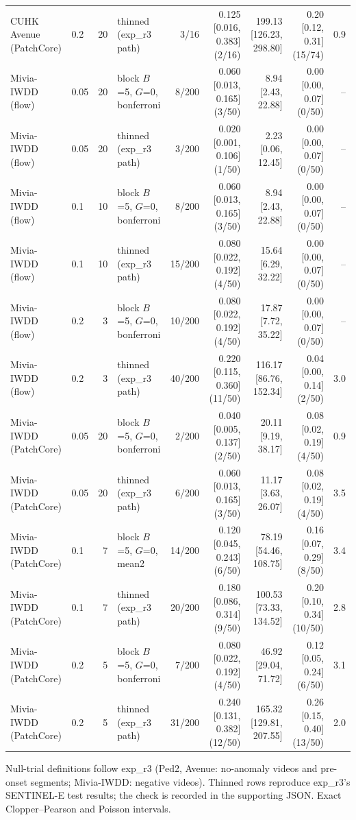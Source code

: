 \begin{table}[t]
{\begin{tabular}{llrlrrrrr}
CUHK Avenue (PatchCore) & 0.2 & 20 & thinned (exp_r3 path) & 3/16 & 0.125 [0.016, 0.383] (2/16) & 199.13 [126.23, 298.80] & 0.20 [0.12, 0.31] (15/74) & 0.9 \\
Mivia-IWDD (flow) & 0.05 & 20 & block $B$=5, $G$=0, bonferroni & 8/200 & 0.060 [0.013, 0.165] (3/50) & 8.94 [2.43, 22.88] & 0.00 [0.00, 0.07] (0/50) & -- \\
Mivia-IWDD (flow) & 0.05 & 20 & thinned (exp_r3 path) & 3/200 & 0.020 [0.001, 0.106] (1/50) & 2.23 [0.06, 12.45] & 0.00 [0.00, 0.07] (0/50) & -- \\
Mivia-IWDD (flow) & 0.1 & 10 & block $B$=5, $G$=0, bonferroni & 8/200 & 0.060 [0.013, 0.165] (3/50) & 8.94 [2.43, 22.88] & 0.00 [0.00, 0.07] (0/50) & -- \\
Mivia-IWDD (flow) & 0.1 & 10 & thinned (exp_r3 path) & 15/200 & 0.080 [0.022, 0.192] (4/50) & 15.64 [6.29, 32.22] & 0.00 [0.00, 0.07] (0/50) & -- \\
Mivia-IWDD (flow) & 0.2 & 3 & block $B$=5, $G$=0, bonferroni & 10/200 & 0.080 [0.022, 0.192] (4/50) & 17.87 [7.72, 35.22] & 0.00 [0.00, 0.07] (0/50) & -- \\
Mivia-IWDD (flow) & 0.2 & 3 & thinned (exp_r3 path) & 40/200 & 0.220 [0.115, 0.360] (11/50) & 116.17 [86.76, 152.34] & 0.04 [0.00, 0.14] (2/50) & 3.0 \\
Mivia-IWDD (PatchCore) & 0.05 & 20 & block $B$=5, $G$=0, bonferroni & 2/200 & 0.040 [0.005, 0.137] (2/50) & 20.11 [9.19, 38.17] & 0.08 [0.02, 0.19] (4/50) & 0.9 \\
Mivia-IWDD (PatchCore) & 0.05 & 20 & thinned (exp_r3 path) & 6/200 & 0.060 [0.013, 0.165] (3/50) & 11.17 [3.63, 26.07] & 0.08 [0.02, 0.19] (4/50) & 3.5 \\
Mivia-IWDD (PatchCore) & 0.1 & 7 & block $B$=5, $G$=0, mean2 & 14/200 & 0.120 [0.045, 0.243] (6/50) & 78.19 [54.46, 108.75] & 0.16 [0.07, 0.29] (8/50) & 3.4 \\
Mivia-IWDD (PatchCore) & 0.1 & 7 & thinned (exp_r3 path) & 20/200 & 0.180 [0.086, 0.314] (9/50) & 100.53 [73.33, 134.52] & 0.20 [0.10, 0.34] (10/50) & 2.8 \\
Mivia-IWDD (PatchCore) & 0.2 & 5 & block $B$=5, $G$=0, bonferroni & 7/200 & 0.080 [0.022, 0.192] (4/50) & 46.92 [29.04, 71.72] & 0.12 [0.05, 0.24] (6/50) & 3.1 \\
Mivia-IWDD (PatchCore) & 0.2 & 5 & thinned (exp_r3 path) & 31/200 & 0.240 [0.131, 0.382] (12/50) & 165.32 [129.81, 207.55] & 0.26 [0.15, 0.40] (13/50) & 2.0 \\
\bottomrule
\end{tabular}}
\begin{minipage}{\linewidth}\vspace{2pt}\footnotesize Null-trial definitions follow exp_r3 (Ped2, Avenue: no-anomaly videos and pre-onset segments; Mivia-IWDD: negative videos). Thinned rows reproduce exp_r3's SENTINEL-E test results; the check is recorded in the supporting JSON. Exact Clopper--Pearson and Poisson intervals.\end{minipage}
\end{table}

